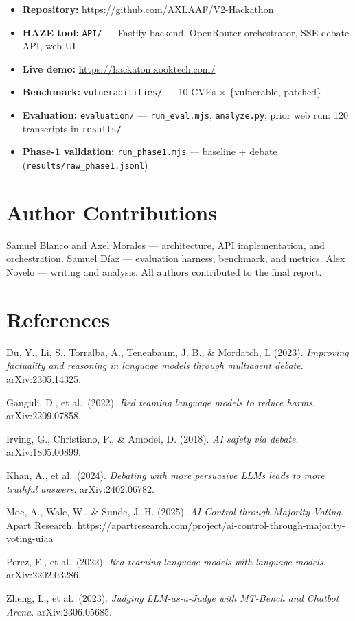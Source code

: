 \documentclass[10pt]{article}
\begin{document}
\begin{itemize}[leftmargin=*,nosep]
  \item \textbf{Repository:} \url{https://github.com/AXLAAF/V2-Hackathon}
  \item \textbf{HAZE tool:} \texttt{API/} --- Fastify backend, OpenRouter orchestrator,
  SSE debate API, web UI
  \item \textbf{Live demo:} \url{https://hackaton.xooktech.com/}
  \item \textbf{Benchmark:} \texttt{vulnerabilities/} --- 10 CVEs $\times$
  \{vulnerable, patched\}
  \item \textbf{Evaluation:} \texttt{evaluation/} --- \texttt{run\_eval.mjs},
  \texttt{analyze.py}; prior web run: 120 transcripts in \texttt{results/}
  \item \textbf{Phase-1 validation:} \texttt{run\_phase1.mjs} --- baseline +
  debate (\texttt{results/raw\_phase1.jsonl})
\end{itemize}

\section*{Author Contributions}

Samuel Blanco and Axel Morales --- architecture, API implementation, and orchestration.
Samuel Díaz --- evaluation harness, benchmark, and metrics. Alex Novelo --- writing and
analysis. All authors contributed to the final report.

\section*{References}

\begin{enumerate}[leftmargin=*,label={[\arabic*]},nosep,itemsep=0.15em]
  \item Du, Y., Li, S., Torralba, A., Tenenbaum, J. B., \& Mordatch, I. (2023).
  \textit{Improving factuality and reasoning in language models through multiagent debate}.
  arXiv:2305.14325.
  \item Ganguli, D., et al.\ (2022). \textit{Red teaming language models to reduce harms}.
  arXiv:2209.07858.
  \item Irving, G., Christiano, P., \& Amodei, D. (2018). \textit{AI safety via debate}.
  arXiv:1805.00899.
  \item Khan, A., et al.\ (2024). \textit{Debating with more persuasive LLMs leads to more
  truthful answers}. arXiv:2402.06782.
  \item Moe, A., Wale, W., \& Sunde, J. H. (2025). \textit{AI Control through Majority
  Voting}. Apart Research.
  \url{https://apartresearch.com/project/ai-control-through-majority-voting-uiaa}
  \item Perez, E., et al.\ (2022). \textit{Red teaming language models with language models}.
  arXiv:2202.03286.
  \item Zheng, L., et al.\ (2023). \textit{Judging LLM-as-a-Judge with MT-Bench and Chatbot
  Arena}. arXiv:2306.05685.
\end{enumerate}
\end{document}
